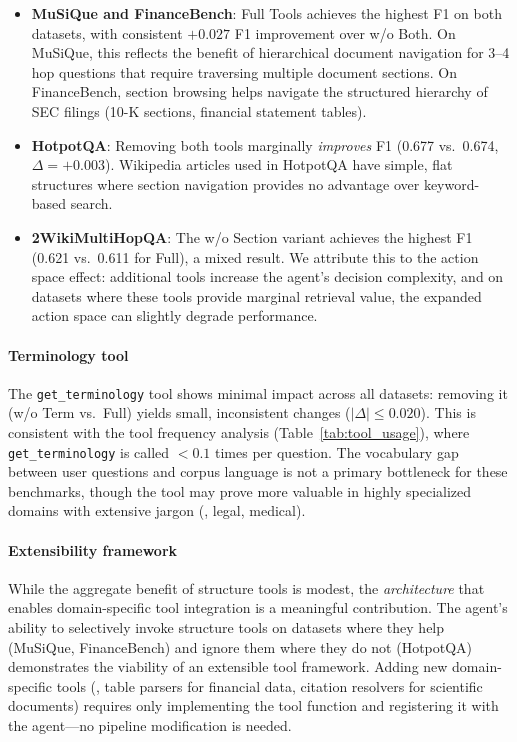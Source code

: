 \begin{itemize}
    \item \textbf{MuSiQue and FinanceBench}: Full Tools achieves the highest F1 on both datasets, with consistent $+0.027$ F1 improvement over w/o Both.
    On MuSiQue, this reflects the benefit of hierarchical document navigation for 3--4 hop questions that require traversing multiple document sections.
    On FinanceBench, section browsing helps navigate the structured hierarchy of SEC filings (10-K sections, financial statement tables).

    \item \textbf{HotpotQA}: Removing both tools marginally \emph{improves} F1 (0.677 vs.\ 0.674, $\Delta = +0.003$).
    Wikipedia articles used in HotpotQA have simple, flat structures where section navigation provides no advantage over keyword-based search.

    \item \textbf{2WikiMultiHopQA}: The w/o Section variant achieves the highest F1 (0.621 vs.\ 0.611 for Full), a mixed result.
    We attribute this to the action space effect: additional tools increase the agent's decision complexity, and on datasets where these tools provide marginal retrieval value, the expanded action space can slightly degrade performance.
\end{itemize}

\paragraph{Terminology tool}
The \texttt{get\_terminology} tool shows minimal impact across all datasets: removing it (w/o Term vs.\ Full) yields small, inconsistent changes ($|\Delta| \leq 0.020$).
This is consistent with the tool frequency analysis (Table~\ref{tab:tool_usage}), where \texttt{get\_terminology} is called $< 0.1$ times per question.
The vocabulary gap between user questions and corpus language is not a primary bottleneck for these benchmarks, though the tool may prove more valuable in highly specialized domains with extensive jargon (\eg, legal, medical).

\paragraph{Extensibility framework}
While the aggregate benefit of structure tools is modest, the \emph{architecture} that enables domain-specific tool integration is a meaningful contribution.
The agent's ability to selectively invoke structure tools on datasets where they help (MuSiQue, FinanceBench) and ignore them where they do not (HotpotQA) demonstrates the viability of an extensible tool framework.
Adding new domain-specific tools (\eg, table parsers for financial data, citation resolvers for scientific documents) requires only implementing the tool function and registering it with the agent---no pipeline modification is needed.

